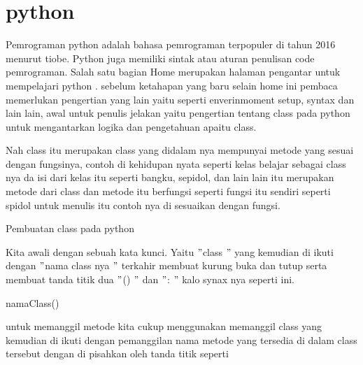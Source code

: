 \section{python}
\noindent 
{\fontsize{14pt}{14pt}\selectfont Pemrograman python adalah bahasa pemrograman terpopuler di tahun 2016 menurut tiobe. Python juga memiliki sintak atau aturan penulisan code pemrograman. Salah satu bagian Home merupakan halaman pengantar untuk mempelajari python . sebelum ketahapan yang baru selain home ini pembaca memerlukan pengertian yang lain yaitu seperti enverinmoment setup, syntax dan lain lain, awal untuk penulis jelakan yaitu pengertian tentang class pada python untuk mengantarkan logika dan pengetahuan apaitu class. \\} \par
\vspace{14pt}
\noindent 
{\fontsize{14pt}{14pt}\selectfont Nah class itu merupakan class yang didalam nya mempunyai metode yang sesuai dengan fungsinya, contoh di kehidupan nyata seperti kelas belajar sebagai class nya da isi dari kelas itu seperti bangku, sepidol, dan lain lain itu merupakan metode dari class dan metode itu berfungsi seperti fungsi itu sendiri seperti spidol untuk menulis itu contoh nya di sesuaikan dengan fungsi. \\} \par
\vspace{14pt}
\noindent 
{\fontsize{14pt}{14pt}\selectfont Pembuatan class pada python  \\} \par
\noindent 
{\fontsize{14pt}{14pt}\selectfont Kita awali dengan sebuah kata kunci. Yaitu  $ " $class $ " $ yang kemudian di ikuti dengan  $ " $nama class nya $ " $ terkahir membuat kurung buka dan tutup serta membuat tanda titik dua  $ " $() $ " $ dan  $ " $: $ " $ kalo synax nya seperti ini. \\} \par
\vspace{14pt}
\noindent 
{\fontsize{14pt}{14pt}\selectfont namaClass() \\} \par
\vspace{14pt}
\noindent 
{\fontsize{14pt}{14pt}\selectfont untuk memanggil metode kita cukup menggunakan memanggil class yang kemudian di ikuti dengan pemanggilan nama metode yang tersedia di dalam class tersebut dengan di pisahkan oleh tanda titik seperti \\} \par
\vspace{14pt}
